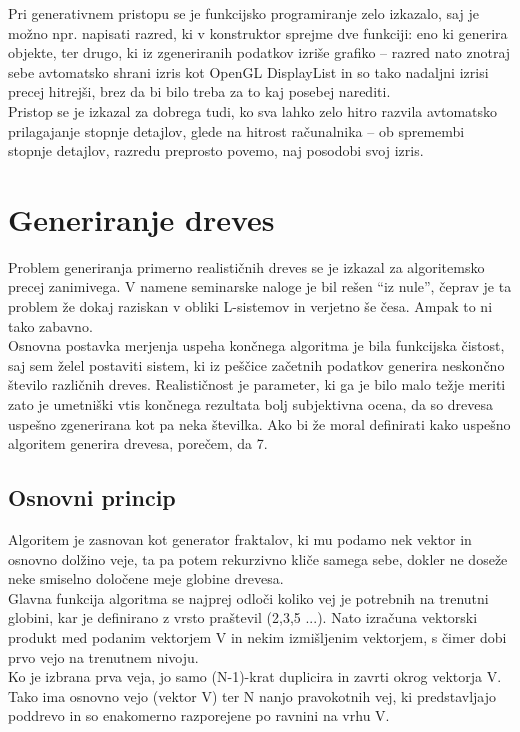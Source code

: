 \documentclass[10pt,a4paper,oneside]{book}
\def\pa{\\[-6pt]}
\begin{document}
Pri generativnem pristopu se je funkcijsko programiranje zelo izkazalo, saj je možno npr. napisati razred, ki v konstruktor sprejme dve funkciji: eno ki generira objekte, ter drugo, ki iz zgeneriranih podatkov izriše grafiko -- razred nato znotraj sebe avtomatsko shrani izris kot OpenGL DisplayList in so tako nadaljni izrisi precej hitrejši, brez da bi bilo treba za to kaj posebej narediti.\pa

Pristop se je izkazal za dobrega tudi, ko sva lahko zelo hitro razvila avtomatsko prilagajanje stopnje detajlov, glede na hitrost računalnika -- ob spremembi stopnje detajlov, razredu preprosto povemo, naj posodobi svoj izris.

\section{Generiranje dreves}
Problem generiranja primerno realističnih dreves se je izkazal za
algoritemsko precej zanimivega. V namene seminarske naloge je bil
rešen ``iz nule'', čeprav je ta problem že dokaj raziskan v obliki
L-sistemov in verjetno še česa. Ampak to ni tako zabavno.\pa

Osnovna postavka merjenja uspeha končnega algoritma je bila funkcijska
čistost, saj sem želel postaviti sistem, ki iz peščice začetnih
podatkov generira neskončno število različnih dreves. Realističnost je
parameter, ki ga je bilo malo težje meriti zato je umetniški vtis
končnega rezultata bolj subjektivna ocena, da so drevesa uspešno
zgenerirana kot pa neka številka. Ako bi že moral definirati kako
uspešno algoritem generira drevesa, porečem, da 7.

\subsection{Osnovni princip}
Algoritem je zasnovan kot generator fraktalov, ki mu podamo nek vektor
in osnovno dolžino veje, ta pa potem rekurzivno kliče samega sebe,
dokler ne doseže neke smiselno določene meje globine drevesa.\pa

Glavna funkcija algoritma se najprej odloči koliko vej je potrebnih na
trenutni globini, kar je definirano z vrsto praštevil (2,3,5
...). Nato izračuna vektorski produkt med podanim vektorjem V in nekim
izmišljenim vektorjem, s čimer dobi prvo vejo na trenutnem nivoju.\pa

Ko je izbrana prva veja, jo samo (N-1)-krat duplicira in zavrti okrog
vektorja V. Tako ima osnovno vejo (vektor V) ter N nanjo pravokotnih
vej, ki predstavljajo poddrevo in so enakomerno razporejene po ravnini
na vrhu V.
\end{document}
